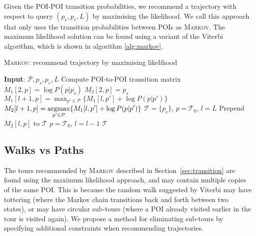 Given the POI-POI transition probabilities, we recommend a trajectory with respect to query
$(p_s, p_e, L)$ by maximising the likelihood. We call this approach that only uses the
transition probabilities between POIs as \textsc{Markov}. The maximum likelihood solution
can be found using a variant of the Viterbi algorithm, which is shown in algorithm \ref{alg:markov}.


\begin{algorithm}
\caption{\textsc{Markov}: recommend trajectory by maximising likelihood}
\label{alg:markov}
\begin{algorithmic}[1]
\STATE \textbf{Input}: $\mathcal{P}, p_s, p_e, L$
\STATE Compute POI-to-POI transition matrix
    \STATE $M_1[2, p] = \log P(p|p_s)$
    \STATE $M_2[2, p] = p_s$
\ENDFOR
{}
        \STATE \(\displaystyle M_1[l+1, p] = \max_{p' \in \mathcal{P}} \{ M_1[l, p'] + \log P(p|p') \} \) 
        \STATE \(\displaystyle M_2[l+1, p] = \operatorname*{argmax}_{p' \in \mathcal{P}} \{ M_1[l, p'] + \log P(p|p') \} \)
    \ENDFOR
\ENDFOR
\STATE $\mathcal{T} = \{p_e\}$, $p = \mathcal{T}_0$, $l = L$
\REPEAT
    \STATE Prepend $M_2[l, p]$ to $\mathcal{T}$
    \STATE $p = \mathcal{T}_0$, $l = l - 1$
\RETURN $\mathcal{T}$
\end{algorithmic}
\end{algorithm}



\subsection{Walks vs Paths}
\label{walkpath}

The tours recommended by \textsc{Markov} described in Section~\ref{sec:transition} are found
using the maximum likelihood approach, and may contain multiple copies of the same POI.
This is because the random walk suggested by Viterbi may have
tottering (where the Markov chain transitions back and forth between two states),
or may have circular sub-tours (where a POI already visited earlier in the tour is
visited again).
We propose a method for eliminating sub-tours by specifying additional constraints
when recommending trajectories.



